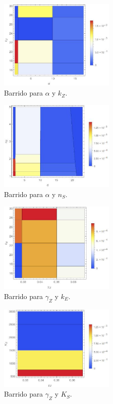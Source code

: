 \documentclass[12pt]{article}
\begin{document}
\begin{figure}[H]
  \centering
  \includegraphics[width=0.5\textwidth]{alpha-kz.jpeg}
  \caption{\label{fig:alpha-kz} Barrido para $\alpha$ y $k_Z$.}
 \end{figure}

\begin{figure}[H]
  \centering
  \includegraphics[width=0.5\textwidth]{alpha-nS.jpeg}
  \caption{\label{fig:alpha-nS} Barrido para $\alpha$ y $n_S$.}
 \end{figure}

\begin{figure}[H]
  \centering
  \includegraphics[width=0.5\textwidth]{gammaZ-kE.jpeg}
  \caption{\label{fig:gammaZ-kE} Barrido para $\gamma_Z$ y $k_E$.}
 \end{figure}

\begin{figure}[H]
  \centering
  \includegraphics[width=0.5\textwidth]{gammaZ-KS.jpeg}
  \caption{\label{fig:gammaZ-KS} Barrido para $\gamma_Z$ y $K_S$.}
 \end{figure}
\end{document}
